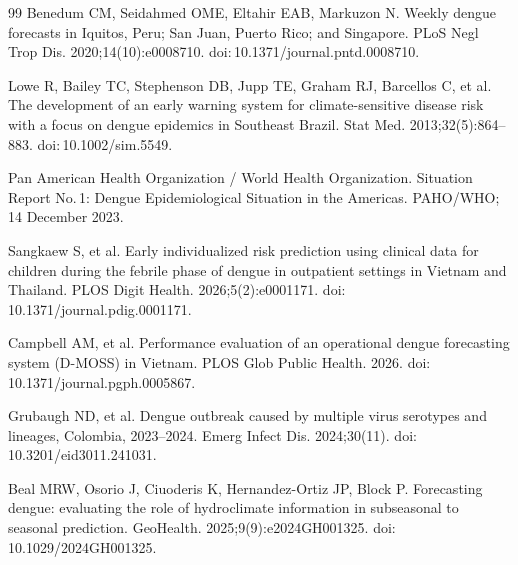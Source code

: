 \documentclass[11pt,a4paper]{article}
\begin{document}
\begin{thebibliography}{99}
 Benedum CM, Seidahmed OME, Eltahir EAB, Markuzon N. Weekly dengue forecasts in Iquitos, Peru; San Juan, Puerto Rico; and Singapore. PLoS Negl Trop Dis. 2020;14(10):e0008710. doi:\,10.1371/journal.pntd.0008710.

 Lowe R, Bailey TC, Stephenson DB, Jupp TE, Graham RJ, Barcellos C, et al. The development of an early warning system for climate-sensitive disease risk with a focus on dengue epidemics in Southeast Brazil. Stat Med. 2013;32(5):864--883. doi:\,10.1002/sim.5549.

 Pan American Health Organization / World Health Organization. Situation Report No.\,1: Dengue Epidemiological Situation in the Americas. PAHO/WHO; 14 December 2023.

 Sangkaew S, et al. Early individualized risk prediction using clinical data for children during the febrile phase of dengue in outpatient settings in Vietnam and Thailand. PLOS Digit Health. 2026;5(2):e0001171. doi:\,10.1371/journal.pdig.0001171.

 Campbell AM, et al. Performance evaluation of an operational dengue forecasting system (D-MOSS) in Vietnam. PLOS Glob Public Health. 2026. doi:\,10.1371/journal.pgph.0005867.

 Grubaugh ND, et al. Dengue outbreak caused by multiple virus serotypes and lineages, Colombia, 2023--2024. Emerg Infect Dis. 2024;30(11). doi:\,10.3201/eid3011.241031.

 Beal MRW, Osorio J, Ciuoderis K, Hernandez-Ortiz JP, Block P. Forecasting dengue: evaluating the role of hydroclimate information in subseasonal to seasonal prediction. GeoHealth. 2025;9(9):e2024GH001325. doi:\,10.1029/2024GH001325.

\end{thebibliography}
\endgroup

\clearpage
\end{document}

